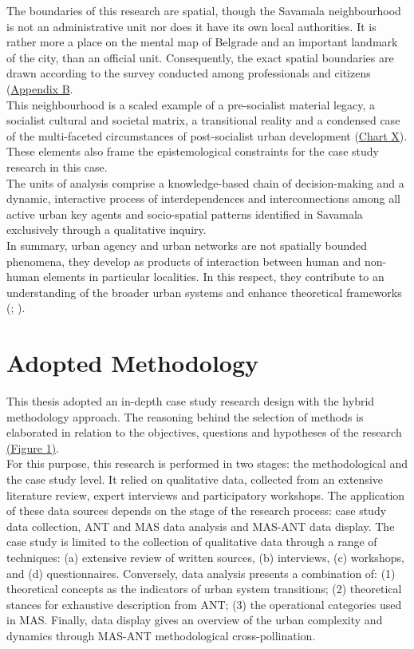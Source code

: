 \documentclass[11pt]{report}
\begin{document}
The boundaries of this research are spatial, though the Savamala neighbourhood is not an administrative unit nor does it have its own local authorities. It is rather more a place on the mental map of Belgrade and an important landmark of the city, than an official unit. Consequently, the exact spatial boundaries are drawn according to the survey conducted among professionals and citizens (\href{Appendix}{Appendix B}.
\\

This neighbourhood is a scaled example of a pre-socialist material legacy, a socialist cultural and societal matrix, a transitional reality and a condensed case of the multi-faceted circumstances of post-socialist urban development (\href{Table space-time}{Chart X}). These elements also frame the epistemological constraints for the case study research in this case.
\\

The units of analysis comprise a knowledge-based chain of decision-making and a dynamic, interactive process of interdependences and interconnections among all active urban key agents and socio-spatial patterns identified in Savamala exclusively through a qualitative inquiry.
\\

In summary, urban agency and urban networks are not spatially bounded phenomena, they develop as products of interaction between human and non-human elements in particular localities. In this respect, they contribute to an understanding of the broader urban systems and enhance theoretical frameworks (\href{Giddens}{\citealt{giddens_constitution_1984}}; \href{Grubovic}{\citealt{grubovic_belgrade_2006}}).

\section{Adopted Methodology}

This thesis adopted an in-depth case study research design with the hybrid methodology approach. The reasoning behind the selection of methods is elaborated in relation to the objectives, questions and hypotheses of the research \href{ref}{(Figure 1)}.  
\\

For this purpose, this research is performed in two stages: the methodological and the case study level. It relied on qualitative data, collected from an extensive literature review, expert interviews and participatory workshops. The application of these data sources depends on the stage of the research process: case study data collection, ANT and MAS data analysis and MAS-ANT data display. The case study is limited to the collection of qualitative data through a range of techniques:  (a) extensive review of written sources, (b) interviews,
(c) workshops, and (d) questionnaires. Conversely, data analysis presents a combination of: (1) theoretical concepts as the indicators of urban system transitions; (2) theoretical stances for exhaustive description from ANT; (3) the operational categories used in MAS. Finally, data display gives an overview of the urban complexity and dynamics through MAS-ANT methodological cross-pollination.
\\
\end{document}
